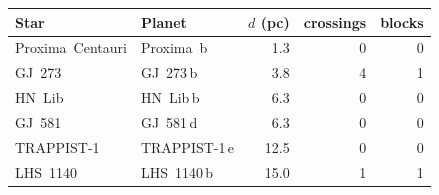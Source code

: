 \begin{tabular}{@{}llrrr@{}}
\hline
Star & Planet & $d$ (pc) & crossings & blocks \\
\hline
Proxima~Centauri & Proxima~b & 1.3 & 0 & 0 \\
GJ~273 & GJ~273\,b & 3.8 & 4 & 1 \\
HN~Lib & HN~Lib\,b & 6.3 & 0 & 0 \\
GJ~581 & GJ~581\,d & 6.3 & 0 & 0 \\
TRAPPIST-1 & TRAPPIST-1\,e & 12.5 & 0 & 0 \\
LHS~1140 & LHS~1140\,b & 15.0 & 1 & 1 \\
\hline
\end{tabular}
